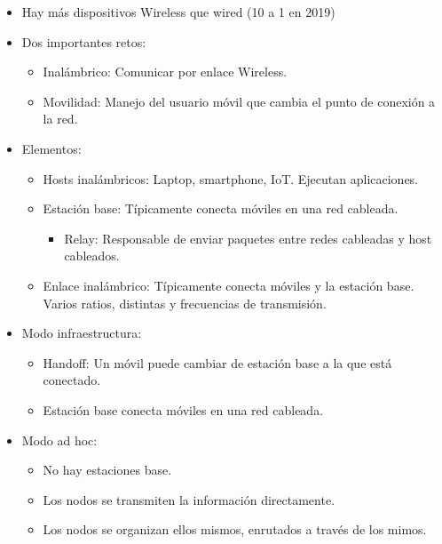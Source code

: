 \documentclass[12pt, twoside, openright]{report} %
\begin{document}
\begin{itemize}
	\item Hay más dispositivos Wireless que wired (10 a 1 en 2019)
	\item Dos importantes retos:

	      \begin{itemize}
		      \item Inalámbrico: Comunicar por enlace Wireless.
		      \item Movilidad: Manejo del usuario móvil que cambia el punto de
		            conexión a la red.
	      \end{itemize}
	      \pagebreak
	\item Elementos:

	      \begin{itemize}
		      \item Hosts inalámbricos: Laptop, smartphone, IoT. Ejecutan
		            aplicaciones.
		      \item Estación base: Típicamente conecta móviles en una red
		            cableada.
		            \begin{itemize}
			            \item Relay: Responsable de enviar paquetes entre redes cableadas y
			                  host cableados.
		            \end{itemize}

		      \item Enlace inalámbrico: Típicamente conecta móviles y la estación base.
		            Varios ratios, distintas y frecuencias de transmisión.
	      \end{itemize}

	\item Modo infraestructura:
	      \begin{itemize}
		      \item Handoff: Un móvil puede cambiar de estación base a la que está conectado.
		      \item Estación base conecta móviles en una red cableada.
	      \end{itemize}

	\item Modo ad hoc:
	      \begin{itemize}
		      \item No hay estaciones base.
		      \item Los nodos se transmiten la información directamente.
		      \item Los nodos se organizan ellos mismos, enrutados a través de los mimos.
	      \end{itemize}


\end{itemize}
\end{document}

